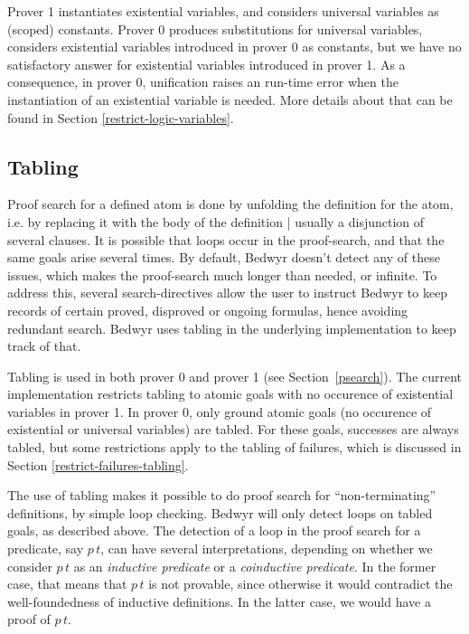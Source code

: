 \documentclass{article}
\begin{document}
Prover 1 instantiates existential variables, and considers universal variables
as (scoped) constants. Prover 0 produces substitutions for universal variables,
considers existential variables introduced in prover 0 as constants,
but we have no satisfactory answer for existential variables introduced in
prover 1.
As a consequence, in prover 0, unification raises an run-time error
when the instantiation of an existential variable is needed.
More details about that can be found in Section \ref{restrict-logic-variables}.

\subsection{Tabling}
\label{tabling}

Proof search for a defined atom is done by unfolding the definition
for the atom, i.e. by replacing it with the body of the definition |
usually a disjunction of several clauses.
It is possible that loops occur in the proof-search,
and that the same goals arise several times.
By default, Bedwyr doesn't detect any of these issues, which makes the
proof-search much longer than needed, or infinite.
To address this, several search-directives
allow the user to instruct Bedwyr to keep records of certain
proved, disproved or ongoing formulas,
hence avoiding redundant search.
Bedwyr uses tabling in the underlying implementation to keep track of that.

Tabling is used in both prover 0 and prover 1 (see Section~\ref{psearch}).
The current implementation restricts tabling to atomic goals
with no occurence of existential variables in prover 1.
In prover 0, only ground atomic goals (no occurence of existential or universal
variables) are tabled.
For these goals, successes are always tabled, but some restrictions apply
to the tabling of failures, which is discussed in Section
\ref{restrict-failures-tabling}.

The use of tabling makes it possible to do proof search for
``non-terminating'' definitions, by simple loop checking.
Bedwyr will only detect loops on tabled goals, as described above.
The detection of a loop in the proof search for a predicate, say
$p\,t$, can have several interpretations, depending on whether
we consider $p\,t$ as an {\em inductive predicate} or
a {\em coinductive predicate}. In the former case, that means that
$p\,t$ is not provable, since otherwise it would contradict
the well-foundedness of inductive definitions. In the latter case,
we would have a proof of $p\,t$.
\end{document}
